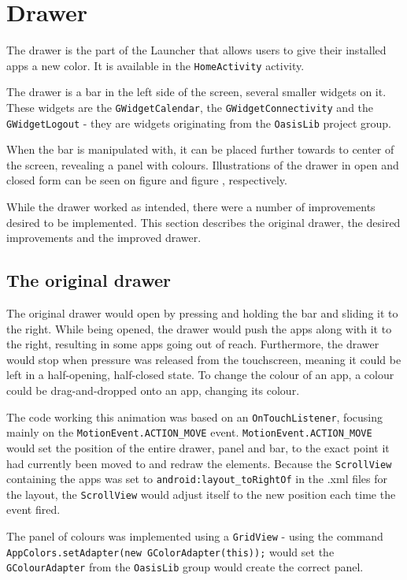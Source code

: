 \section{Drawer}
The drawer is the part of the Launcher that allows users to give their installed apps a new color.
It is available in the \lstinline{HomeActivity} activity.

The drawer is a bar in the left side of the screen, several smaller widgets on it.
These widgets are the \lstinline{GWidgetCalendar}, the \lstinline{GWidgetConnectivity} and the \lstinline{GWidgetLogout} - they are widgets originating from the \lstinline{OasisLib} project group.

When the bar is manipulated with, it can be placed further towards to center of the screen, revealing a panel with colours.
Illustrations of the drawer in open and closed form can be seen on figure  and figure , respectively.

While the drawer worked as intended, there were a number of improvements desired to be implemented.
This section describes the original drawer, the desired improvements and the improved drawer.

\subsection{The original drawer}

The original drawer would open by pressing and holding the bar and sliding it to the right.
While being opened, the drawer would push the apps along with it to the right, resulting in some apps going out of reach.
Furthermore, the drawer would stop when pressure was released from the touchscreen, meaning it could be left in a half-opening, half-closed state.
To change the colour of an app, a colour could be drag-and-dropped onto an app, changing its colour.

The code working this animation was based on an \lstinline{OnTouchListener}, focusing mainly on the \lstinline{MotionEvent.ACTION_MOVE} event.
\lstinline{MotionEvent.ACTION_MOVE} would set the position of the entire drawer, panel and bar, to the exact point it had currently been moved to and redraw the elements.
Because the \lstinline{ScrollView} containing the apps was set to \lstinline{android:layout_toRightOf} in the .xml files for the layout, the \lstinline{ScrollView} would adjust itself to the new position each time the event fired.

The panel of colours was implemented using a \lstinline{GridView} - using the command \lstinline{AppColors.setAdapter(new GColorAdapter(this));} would set the \lstinline{GColourAdapter} from the \lstinline{OasisLib} group would create the correct panel.

